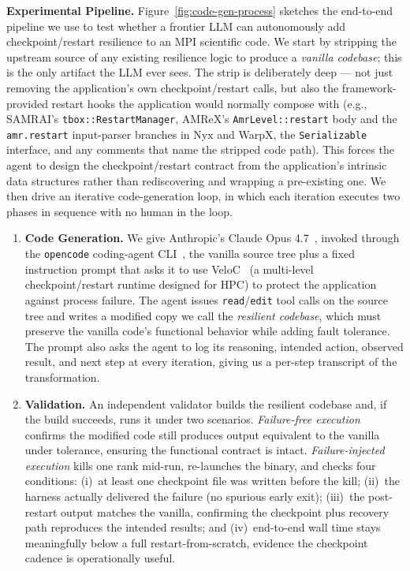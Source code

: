 \documentclass[conference]{IEEEtran}
\begin{document}
\medskip
\noindent\textbf{Experimental Pipeline.}
Figure~\ref{fig:code-gen-process} sketches the end-to-end pipeline we use to test whether
a frontier LLM can autonomously add checkpoint/restart resilience to an MPI scientific
code.  We start by stripping the upstream source of any existing resilience logic to
produce a \emph{vanilla codebase}; this is the only artifact the LLM ever sees.  The strip
is deliberately deep --- not just removing the application's own checkpoint/restart calls,
but also the framework-provided restart hooks the application would normally compose with
(e.g., SAMRAI's \texttt{tbox::RestartManager}, AMReX's \texttt{AmrLevel::restart} body
and the \texttt{amr.restart} input-parser branches in Nyx and WarpX, the
\texttt{Serializable} interface, and any comments that name the stripped code path).
This forces the agent to design the checkpoint/restart contract from the application's
intrinsic data structures rather than rediscovering and wrapping a pre-existing one.
We then drive an iterative code-generation loop, in which each iteration executes two
phases in sequence with no human in the loop.

\begin{enumerate}[topsep=0pt,itemsep=0pt,leftmargin=*]
    \item \textbf{Code Generation.} We give Anthropic's Claude Opus 4.7~\cite{claude}, invoked through the \texttt{opencode} coding-agent CLI~\cite{opencode}, the vanilla source tree plus a fixed instruction prompt that asks it to use VeloC~\cite{veloc} (a multi-level checkpoint/restart runtime designed for HPC) to protect the application against process failure. The agent issues \texttt{read}/\texttt{edit} tool calls on the source tree and writes a modified copy we call the \emph{resilient codebase}, which must preserve the vanilla code's functional behavior while adding fault tolerance. The prompt also asks the agent to log its reasoning, intended action, observed result, and next step at every iteration, giving us a per-step transcript of the transformation.

    \item \textbf{Validation.} An independent validator builds the resilient codebase and, if the build succeeds, runs it under two scenarios. \emph{Failure-free execution} confirms the modified code still produces output equivalent to the vanilla under tolerance, ensuring the functional contract is intact. \emph{Failure-injected execution} kills one rank mid-run, re-launches the binary, and checks four conditions: (i)~at least one checkpoint file was written before the kill; (ii)~the harness actually delivered the failure (no spurious early exit); (iii)~the post-restart output matches the vanilla, confirming the checkpoint plus recovery path reproduces the intended results; and (iv)~end-to-end wall time stays meaningfully below a full restart-from-scratch, evidence the checkpoint cadence is operationally useful.
\end{enumerate}
\end{document}

